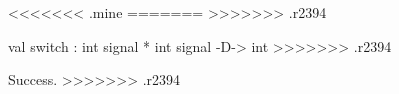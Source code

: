 <<<<<<< .mine
\chklistingfalse
=======
\chklistingtrue
>>>>>>> .r2394
\begin{ChkListingMsg}
val switch : int signal * int signal -D-> int 
>>>>>>> .r2394
\end{ChkListingMsg}
\begin{ChkListingErr}
Success.
>>>>>>> .r2394
\end{ChkListingErr}
